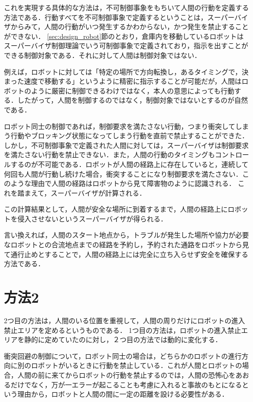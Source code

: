 これを実現する具体的な方法は，不可制御事象をもちいて人間の行動を定義する方法である．行動すべてを不可制御事象で定義するということは，スーパーバイザからみて，人間の行動がいつ発生するかわからない，かつ発生を禁止することができない． 
\ref{sec:design_robot}節のとおり，倉庫内を移動しているロボットはスーパーバイザ制御理論でいう可制御事象で定義されており，指示を出すことができる制御対象である．それに対して人間は制御対象ではない．

例えば，ロボットに対しては「特定の場所で方向転換し，あるタイミングで，決まった速度で移動する」というように精密に指示することが可能だが，人間はロボットのように厳密に制御できるわけではなく，本人の意思によっても行動する．したがって，人間を制御するのではなく，制御対象ではないとするのが自然である．

ロボット同士の制御であれば，制御要求を満たさない行動，つまり衝突してしまう行動やブロッキング状態になってしまう行動を直前で禁止することができた．しかし，不可制御事象で定義された人間に対しては，スーパーバイザは制御要求を満たさない行動を禁止できない．また，人間の行動のタイミングもコントロールするのが不可能である．ロボットが人間の経路上に存在していると，連続して何回も人間が行動し続けた場合，衝突することになり制御要求を満たさない．このような理由で人間の経路はロボットから見て障害物のように認識される．
これを踏まえて，スーパーバイザが計算される．

この計算結果として，人間が安全な場所に到着するまで，人間の経路上にロボットを侵入させないというスーパーバイザが得られる．


言い換えれば，人間のスタート地点から，トラブルが発生した場所や協力が必要なロボットとの合流地点までの経路を予約し，予約された通路をロボットから見て通行止めとすることで，人間の経路上には完全に立ち入らせず安全を確保する方法である．


\section{方法2}
2つ目の方法は，人間のいる位置を重視して，人間の周りだけにロボットの進入禁止エリアを定めるというものである．
1つ目の方法は，ロボットの進入禁止エリアを静的に定めていたのに対し，２つ目の方法では動的に変化する．

衝突回避の制御について，ロボット同士の場合は，どちらかのロボットの進行方向に別のロボットがいるときに行動を禁止している．これが人間とロボットの場合，人間の前に来てからロボットの行動を禁止するのでは，人間の恐怖心をあおるだけでなく，万が一エラーが起こることも考慮に入れると事故のもとになるという理由から，ロボットと人間の間に一定の距離を設ける必要性がある． 

